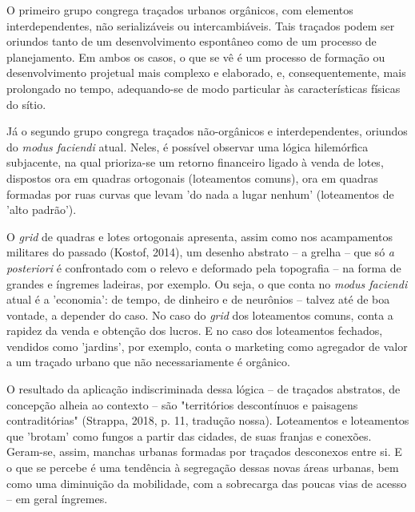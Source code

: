 \documentclass[]{report}
\begin{document}
	O primeiro grupo congrega traçados urbanos orgânicos, com elementos interdependentes, não serializáveis ou intercambiáveis. Tais traçados podem ser oriundos tanto de um desenvolvimento espontâneo como de um processo de planejamento. Em ambos os casos, o que se vê é um processo de formação ou desenvolvimento projetual mais complexo e elaborado, e, consequentemente, mais prolongado no tempo, adequando-se de modo particular às características físicas do sítio. 

	Já o segundo grupo congrega traçados não-orgânicos e interdependentes, oriundos do \textit{modus faciendi} atual. Neles, é possível observar uma lógica hilemórfica subjacente, na qual prioriza-se um retorno financeiro ligado à venda de lotes, dispostos ora em quadras ortogonais (loteamentos comuns), ora em quadras formadas por ruas curvas que levam 'do nada a lugar nenhum' (loteamentos de 'alto padrão'). %

	O \textit{grid} de quadras e lotes ortogonais apresenta, assim como nos acampamentos militares do passado (Kostof, 2014), um desenho abstrato – a grelha – que só \textit{a posteriori} é confrontado com o relevo e deformado pela topografia – na forma de grandes e íngremes ladeiras, por exemplo. Ou seja, o que conta no \textit{modus faciendi} atual é a 'economia': de tempo, de dinheiro e de neurônios – talvez até de boa vontade, a depender do caso. No caso do \textit{grid} dos loteamentos comuns, conta a rapidez da venda e obtenção dos lucros. E no caso dos loteamentos fechados, vendidos como 'jardins', por exemplo, conta o marketing como agregador de valor a um traçado urbano que não necessariamente é orgânico.
	
	O resultado da aplicação indiscriminada dessa lógica – de traçados abstratos, de concepção alheia ao contexto – são "territórios descontínuos e paisagens contraditórias" (Strappa, 2018, p. 11, tradução nossa). Loteamentos e loteamentos que 'brotam' como fungos a partir das cidades, de suas franjas e conexões. Geram-se, assim, manchas urbanas formadas por traçados desconexos entre si. E o que se percebe é uma tendência à segregação dessas novas áreas urbanas, bem como uma diminuição da mobilidade, com a sobrecarga das poucas vias de acesso – em geral íngremes.
\end{document}
